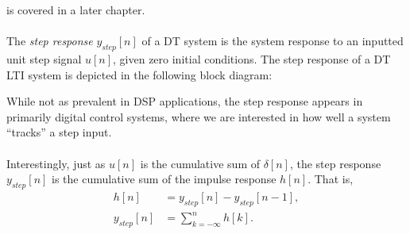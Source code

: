\documentclass{report}
\begin{document}
is covered in a later chapter.
\\ \\
The \emph{step response} $y_{step}[n]$ of a DT system is the system response to an inputted unit step signal $u[n]$, given zero initial conditions. 
The step response of a DT LTI system is depicted in the following block diagram:
\begin{center}
\end{center}
While not as prevalent in DSP applications, the step response appears in primarily digital control systems, where 
we are interested in how well a system ``tracks'' a step input.
\\ \\
Interestingly, just as $u[n]$ is the cumulative sum of $\delta[n]$, the step response $y_{step}[n]$ is the cumulative sum of the impulse response $h[n]$. That is,
\begin{align}
    h[n] &= y_{step}[n] - y_{step}[n-1], \\
    y_{step}[n] &= \sum_{k=-\infty}^{n} h[k].
\end{align}
\end{document}
